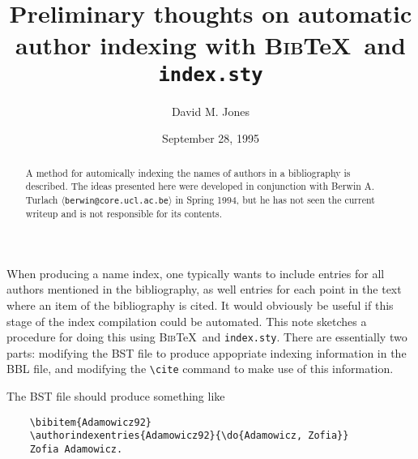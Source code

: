 \documentclass{article}
\newcommand*{\email}[1]{$\langle$\texttt{#1}$\rangle$}
\newcommand{\BibTeX}{\textsc{Bib}\TeX}
\begin{document}
\title{Preliminary thoughts on automatic author indexing with \BibTeX\
and \texttt{index.sty}}

\author{David M. Jones}

\date{September 28, 1995}

\maketitle

\begin{abstract}

A method for automically indexing the names of authors in a
bibliography is described.  The ideas presented here were developed in
conjunction with Berwin A. Turlach \email{berwin@core.ucl.ac.be} in
Spring 1994, but he has not seen the current writeup and is not
responsible for its contents.

\end{abstract}

When producing a name index, one typically wants to include entries
for all authors mentioned in the bibliography, as well entries for
each point in the text where an item of the bibliography is cited.  It
would obviously be useful if this stage of the index compilation could
be automated.  This note sketches a procedure for doing this using
\BibTeX\ and \texttt{index.sty}.  There are essentially two parts:
modifying the BST file to produce appopriate indexing information in
the BBL file, and modifying the \verb+\cite+ command to make use of
this information.

The BST file should produce something like
\begin{verbatim}
    \bibitem{Adamowicz92}
    \authorindexentries{Adamowicz92}{\do{Adamowicz, Zofia}}
    Zofia Adamowicz.
\end{verbatim}
\end{document}
